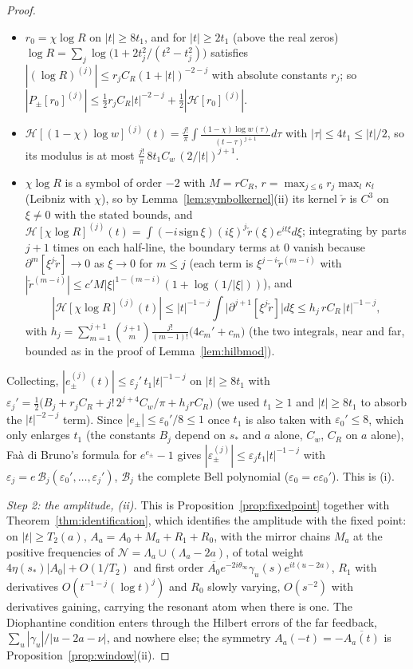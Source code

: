 \documentclass[11pt]{article}
\theoremstyle{definition}
\theoremstyle{remark}
\begin{document}
\begin{proof}
\begin{itemize}
\item[(b)] $r_0=\chi\log R$ on $|t|\ge8t_1$, and for $|t|\ge2t_1$ (above the real zeros) $\log R=\sum_j\log\big(1+2t_j^2/(t^2-t_j^2)\big)$ satisfies $|(\log R)^{(j)}|\le r_jC_R(1+|t|)^{-2-j}$ with absolute constants $r_j$; so $|P_\pm[r_0]^{(j)}|\le\tfrac12r_jC_R|t|^{-2-j}+\tfrac12|\mathcal H[r_0]^{(j)}|$.
\item[(c)] $\mathcal H[(1-\chi)\log w]^{(j)}(t)=\frac{j!}\pi\int\frac{(1-\chi)\log w(\tau)}{(t-\tau)^{j+1}}d\tau$ with $|\tau|\le4t_1\le|t|/2$, so its modulus is at most $\frac{j!}\pi\,8t_1C_w\,(2/|t|)^{j+1}$.
\item[(d)] $\chi\log R$ is a symbol of order $-2$ with $M=rC_R$, $r=\max_{j\le6}r_j\max_l\kappa_l$ (Leibniz with $\chi$), so by Lemma~\ref{lem:symbolkernel}(ii) its kernel $\check r$ is $C^3$ on $\xi\ne0$ with the stated bounds, and $\mathcal H[\chi\log R]^{(j)}(t)=\int(-i\,\mathrm{sign}\,\xi)(i\xi)^j\check r(\xi)e^{it\xi}d\xi$; integrating by parts $j+1$ times on each half-line, the boundary terms at $0$ vanish because $\partial^m[\xi^j\check r]\to0$ as $\xi\to0$ for $m\le j$ (each term is $\xi^{j-i}\check r^{(m-i)}$ with $|\check r^{(m-i)}|\le c'M|\xi|^{1-(m-i)}(1+\log(1/|\xi|))$), and
\[
|\mathcal H[\chi\log R]^{(j)}(t)|\le|t|^{-1-j}\int\big|\partial^{j+1}[\xi^j\check r]\big|d\xi\le h_j\,rC_R\,|t|^{-1-j},
\]
with $h_j=\sum_{m=1}^{j+1}\binom{j+1}m\frac{j!}{(m-1)!}\big(4c_m'+c_m\big)$
(the two integrals, near and far, bounded as in the proof of Lemma~\ref{lem:hilbmod}).
\end{itemize}
Collecting, $|e_\pm^{(j)}(t)|\le\varepsilon_j'\,t_1|t|^{-1-j}$ on $|t|\ge8t_1$ with $\varepsilon_j'=\tfrac12\big(B_j+r_jC_R+j!\,2^{j+4}C_w/\pi+h_jrC_R\big)$ (we used $t_1\ge1$ and $|t|\ge8t_1$ to absorb the $|t|^{-2-j}$ term). Since $|e_\pm|\le\varepsilon_0'/8\le1$ once $t_1$ is also taken with $\varepsilon_0'\le8$, which only enlarges $t_1$ (the constants $B_j$ depend on $s_*$ and $a$ alone, $C_w$, $C_R$ on $a$ alone), Fa\`a di Bruno's formula for $e^{e_\pm}-1$ gives $|\varepsilon_\pm^{(j)}|\le\varepsilon_jt_1|t|^{-1-j}$ with $\varepsilon_j=e\,\mathcal B_j(\varepsilon_0',\dots,\varepsilon_j')$, $\mathcal B_j$ the complete Bell polynomial ($\varepsilon_0=e\varepsilon_0'$). This is (i).

\emph{Step 2: the amplitude, (ii).} This is Proposition~\ref{prop:fixedpoint} together with Theorem~\ref{thm:identification}, which identifies the amplitude with the fixed point: on $|t|\ge T_2(a)$, $A_a=A_0+M_a+R_1+R_0$, with the mirror chains $M_a$ at the positive frequencies of $\mathcal N=\Lambda_a\cup(\Lambda_a-2a)$, of total weight $4\eta(s_*)|A_0|+O(1/T_2)$ and first order $\overline{A_0}e^{-2i\theta_\infty}\gamma_u(s)e^{it(u-2a)}$, $R_1$ with derivatives $O(t^{-1-j}(\log t)^j)$ and $R_0$ slowly varying, $O(s^{-2})$ with derivatives gaining, carrying the resonant atom when there is one. The Diophantine condition enters through the Hilbert errors of the far feedback, $\sum_u|\gamma_u|/|u-2a-\nu|$, and nowhere else; the symmetry $A_a(-t)=-\overline{A_a(t)}$ is Proposition~\ref{prop:window}(ii).


\end{proof}
\end{document}
